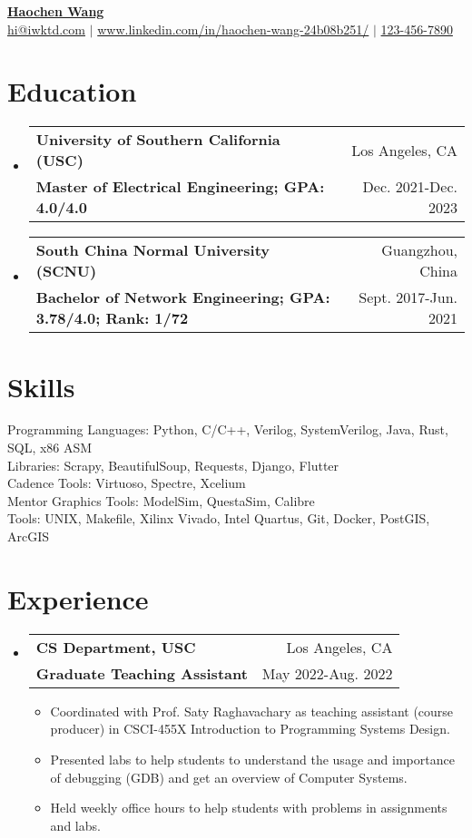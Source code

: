\documentclass[letterpaper,11pt]{article}
\makeatletter
\newcommand{\resumeItemOne}[1]{
  \item\small{#1}
}
\newcommand{\resumeSubheading}[4]{
  \vspace{-1pt}\item
    \begin{tabular*}{0.97\textwidth}[t]{l@{\extracolsep{\fill}}r}
      \textbf{#1} & #2 \\
      \textbf{\small#3} & \small{#4} \\
    \end{tabular*}\vspace{-5pt}
}
\newcommand{\resumeSubHeadingListStart}{\begin{itemize}[leftmargin=*]}
\newcommand{\resumeSubHeadingListEnd}{\end{itemize}}
\newcommand{\resumeItemListStart}{\begin{itemize}}
\newcommand{\resumeItemListEnd}{\end{itemize}\vspace{-5pt}}
\makeatother
\begin{document}
\textbf{\href{https://www.linkedin.com/in/haochen-wang-24b08b251/}{\Large {Haochen Wang}}} \\
{
    \href{mailto:{hi@iwktd.com}}{{hi@iwktd.com}} $|$ \href{https://www.linkedin.com/in/haochen-wang-24b08b251/}{www.linkedin.com/in/haochen-wang-24b08b251/} $|$ \href{tel:123-456-7890}{123-456-7890}
}
\section{Education}
\resumeSubHeadingListStart
\resumeSubheading
    {University of Southern California (USC)}{Los Angeles, CA}
    {Master of Electrical Engineering; GPA: 4.0/4.0
}{Dec. 2021-Dec. 2023}
\resumeSubheading
    {South China Normal University (SCNU)}{Guangzhou, China}
    {Bachelor of Network Engineering; GPA: 3.78/4.0; Rank: 1/72
}{Sept. 2017-Jun. 2021}
\resumeSubHeadingListEnd



\section{Skills}
Programming Languages: Python, C/C++, Verilog, SystemVerilog, Java, Rust, SQL, x86 ASM\\ 
Libraries: Scrapy, BeautifulSoup, Requests, Django, Flutter\\ 
Cadence Tools: Virtuoso, Spectre, Xcelium\\ 
Mentor Graphics Tools: ModelSim, QuestaSim, Calibre\\ 
Tools: UNIX, Makefile, Xilinx Vivado, Intel Quartus, Git, Docker, PostGIS, ArcGIS\\ 


\section{Experience}
\resumeSubHeadingListStart
\resumeSubheading
    {CS Department, USC}{Los Angeles, CA}
    {Graduate Teaching Assistant}{May 2022-Aug. 2022}
\resumeItemListStart
	\resumeItemOne{Coordinated with Prof. Saty Raghavachary as teaching assistant (course producer) in CSCI-455X Introduction to Programming Systems Design.}
	\resumeItemOne{Presented labs to help students to understand the usage and importance of debugging (GDB) and get an overview of Computer Systems.}
	\resumeItemOne{Held weekly office hours to help students with problems in assignments and labs.}
\resumeItemListEnd
\resumeSubHeadingListEnd
\end{document}
